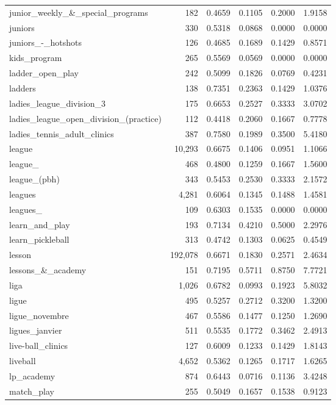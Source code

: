 \begin{table}[htbp]
\begin{tabular}{lrrrrr}
  junior\_weekly\_\&\_special\_programs & 182 & 0.4659 & 0.1105 & 0.2000 & 1.9158 \\
  juniors & 330 & 0.5318 & 0.0868 & 0.0000 & 0.0000 \\
  juniors\_-\_hotshots & 126 & 0.4685 & 0.1689 & 0.1429 & 0.8571 \\
  kids\_program & 265 & 0.5569 & 0.0569 & 0.0000 & 0.0000 \\
  ladder\_open\_play & 242 & 0.5099 & 0.1826 & 0.0769 & 0.4231 \\
  ladders & 138 & 0.7351 & 0.2363 & 0.1429 & 1.0376 \\
  ladies\_league\_division\_3 & 175 & 0.6653 & 0.2527 & 0.3333 & 3.0702 \\
  ladies\_league\_open\_division\_(practice) & 112 & 0.4418 & 0.2060 & 0.1667 & 0.7778 \\
  ladies\_tennis\_adult\_clinics & 387 & 0.7580 & 0.1989 & 0.3500 & 5.4180 \\
  league & 10,293 & 0.6675 & 0.1406 & 0.0951 & 1.1066 \\
  league\_ & 468 & 0.4800 & 0.1259 & 0.1667 & 1.5600 \\
  league\_(pbh) & 343 & 0.5453 & 0.2530 & 0.3333 & 2.1572 \\
  leagues & 4,281 & 0.6064 & 0.1345 & 0.1488 & 1.4581 \\
  leagues\_ & 109 & 0.6303 & 0.1535 & 0.0000 & 0.0000 \\
  learn\_and\_play & 193 & 0.7134 & 0.4210 & 0.5000 & 2.2976 \\
  learn\_pickleball & 313 & 0.4742 & 0.1303 & 0.0625 & 0.4549 \\
  lesson & 192,078 & 0.6671 & 0.1830 & 0.2571 & 2.4634 \\
  lessons\_\&\_academy & 151 & 0.7195 & 0.5711 & 0.8750 & 7.7721 \\
  liga & 1,026 & 0.6782 & 0.0993 & 0.1923 & 5.8032 \\
  ligue & 495 & 0.5257 & 0.2712 & 0.3200 & 1.3200 \\
  ligue\_novembre & 467 & 0.5586 & 0.1477 & 0.1250 & 1.2690 \\
  ligues\_janvier & 511 & 0.5535 & 0.1772 & 0.3462 & 2.4913 \\
  live-ball\_clinics & 127 & 0.6009 & 0.1233 & 0.1429 & 1.8143 \\
  liveball & 4,652 & 0.5362 & 0.1265 & 0.1717 & 1.6265 \\
  lp\_academy & 874 & 0.6443 & 0.0716 & 0.1136 & 3.4248 \\
  match\_play & 255 & 0.5049 & 0.1657 & 0.1538 & 0.9123 \\

\end{tabular}
\end{table}
